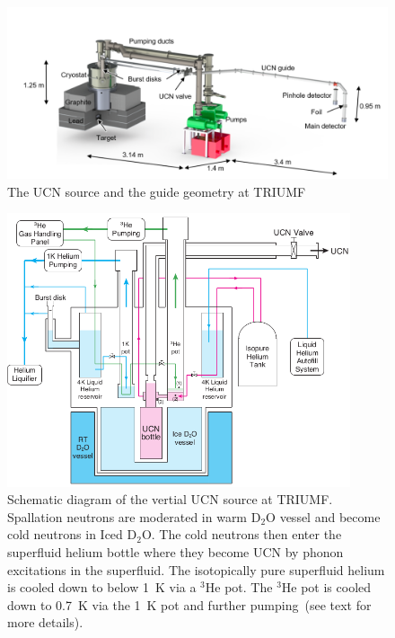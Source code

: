 \begin{figure}[h!]
  \centering
  \includegraphics[width=1.1\textwidth]{Source_all.png}
  \caption{The UCN source and the guide geometry at TRIUMF}
  \label{fig:Source_all}
\end{figure}




\begin{figure}[h!]
  \centering
  \includegraphics[width=0.9\textwidth]{vertical_source.png}
  \caption[Schematic diagram of the vertial UCN source at
  TRIUMF]{Schematic diagram of the vertial UCN source at
    TRIUMF. Spallation neutrons are moderated in warm D$_2$O vessel
    and become cold neutrons in Iced D$_2$O. The cold neutrons then
    enter the superfluid helium bottle where they become UCN by phonon
    excitations in the superfluid. The isotopically pure superfluid
    helium is cooled down to below 1~K via a $^3$He pot. The $^3$He
    pot is cooled down to 0.7~K via the 1~K pot and further
    pumping~(see text for more details). }
  \label{fig:source}
\end{figure}



